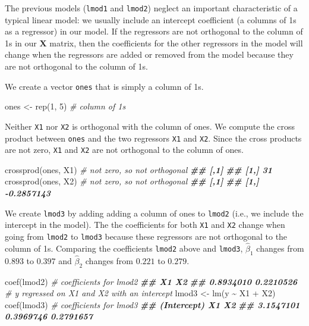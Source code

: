 \documentclass[
]{book}
\newenvironment{Shaded}{\begin{snugshade}}{\end{snugshade}}
\newcommand{\CommentTok}[1]{\textcolor[rgb]{0.56,0.35,0.01}{\textit{#1}}}
\newcommand{\DecValTok}[1]{\textcolor[rgb]{0.00,0.00,0.81}{#1}}
\newcommand{\DocumentationTok}[1]{\textcolor[rgb]{0.56,0.35,0.01}{\textbf{\textit{#1}}}}
\newcommand{\FunctionTok}[1]{\textcolor[rgb]{0.00,0.00,0.00}{#1}}
\newcommand{\NormalTok}[1]{#1}
\newcommand{\OtherTok}[1]{\textcolor[rgb]{0.56,0.35,0.01}{#1}}
\newcommand{\SpecialCharTok}[1]{\textcolor[rgb]{0.00,0.00,0.00}{#1}}
\theoremstyle{definition}
\theoremstyle{definition}
\theoremstyle{definition}
\theoremstyle{definition}
\theoremstyle{remark}
\begin{document}
The previous models (\texttt{lmod1} and \texttt{lmod2}) neglect an important characteristic of a typical linear model: we usually include an intercept coefficient (a columns of 1s as a regressor) in our model. If the regressors are not orthogonal to the column of 1s in our \(\mathbf{X}\) matrix, then the coefficients for the other regressors in
the model will change when the regressors are added or removed from the model because they are not orthogonal to the column of 1s.

We create a vector \texttt{ones} that is simply a column of 1s.

\begin{Shaded}
\begin{Highlighting}[]
\NormalTok{ones }\OtherTok{\textless{}{-}} \FunctionTok{rep}\NormalTok{(}\DecValTok{1}\NormalTok{, }\DecValTok{5}\NormalTok{)   }\CommentTok{\# column of 1s}
\end{Highlighting}
\end{Shaded}

Neither \texttt{X1} nor \texttt{X2} is orthogonal with the column of ones. We compute the cross product between \texttt{ones} and the two regressors \texttt{X1} and \texttt{X2}. Since the cross products are not zero, \texttt{X1} and \texttt{X2} are not orthogonal to the
column of ones.

\begin{Shaded}
\begin{Highlighting}[]
\FunctionTok{crossprod}\NormalTok{(ones, X1) }\CommentTok{\# not zero, so not orthogonal}
\DocumentationTok{\#\#      [,1]}
\DocumentationTok{\#\# [1,]   31}
\FunctionTok{crossprod}\NormalTok{(ones, X2) }\CommentTok{\# not zero, so not orthogonal}
\DocumentationTok{\#\#            [,1]}
\DocumentationTok{\#\# [1,] {-}0.2857143}
\end{Highlighting}
\end{Shaded}

We create \texttt{lmod3} by adding adding a column of ones to \texttt{lmod2} (i.e.,
we include the intercept in the model). The the coefficients for both
\texttt{X1} and \texttt{X2} change when going from \texttt{lmod2} to \texttt{lmod3} because these
regressors are not orthogonal to the column of 1s. Comparing the
coefficients \texttt{lmod2} above and \texttt{lmod3}, \(\hat{\beta}_1\) changes from
\(0.893\) to \(0.397\) and \(\hat{\beta}_2\) changes from \(0.221\) to \(0.279\).

\begin{Shaded}
\begin{Highlighting}[]
\FunctionTok{coef}\NormalTok{(lmod2) }\CommentTok{\# coefficients for lmod2}
\DocumentationTok{\#\#        X1        X2 }
\DocumentationTok{\#\# 0.8934010 0.2210526}
\CommentTok{\# y regressed on X1 and X2 with an intercept}
\NormalTok{lmod3 }\OtherTok{\textless{}{-}} \FunctionTok{lm}\NormalTok{(y }\SpecialCharTok{\textasciitilde{}}\NormalTok{ X1 }\SpecialCharTok{+}\NormalTok{ X2)}
\FunctionTok{coef}\NormalTok{(lmod3) }\CommentTok{\# coefficients for lmod3}
\DocumentationTok{\#\# (Intercept)          X1          X2 }
\DocumentationTok{\#\#   3.1547101   0.3969746   0.2791657}
\end{Highlighting}
\end{Shaded}
\end{document}

